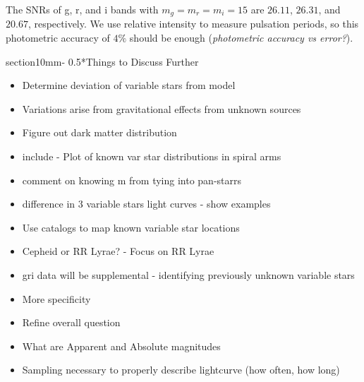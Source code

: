 \documentclass[letterpaper,11pt]{article}
\makeatletter
\renewcommand{\section}{\@startsection%
{section}{1}{0mm}{-\baselineskip}%
{0.5\baselineskip}{\normalfont\Large\bfseries}}%
\makeatother
\begin{document}
\vspace{3mm} %

\noindent The SNRs of g, r, and i bands with $m_g = m_r = m_i = 15$ are $26.11$, $26.31$, and $20.67$, respectively. We use relative intensity to measure pulsation periods, so this photometric accuracy of $4 \%$ should be enough (\textit{photometric accuracy vs error?}).


\section*{Things to Discuss Further}

\begin{itemize}
	\item{} Determine deviation of variable stars from model
	\item{} Variations arise from gravitational effects from unknown sources
	\item{} Figure out dark matter distribution
	\item{} include - Plot of known var star distributions in spiral arms
	\item{} comment on knowing m from tying into pan-starrs
	\item{} difference in 3 variable stars light curves - show examples
\end{itemize}

\begin{itemize}
	\item{} Use catalogs to map known variable star locations
	\item{} Cepheid or RR Lyrae? - Focus on RR Lyrae
	\item{} gri data will be supplemental - identifying previously unknown variable stars
	\item{} More specificity
	\item{} Refine overall question
	\item{} What are Apparent and Absolute magnitudes
	\item{} Sampling necessary to properly describe lightcurve (how often, how long)
\end{itemize}
\end{document}

